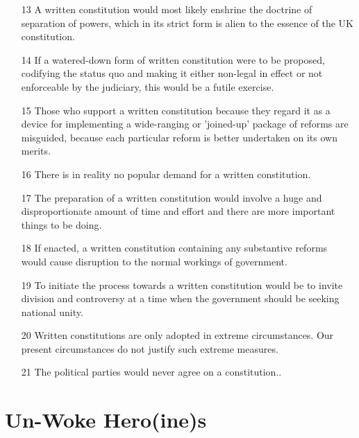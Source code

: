 \documentclass[14pt,titlepage]{extarticle}
\begin{document}
\begin{itemize}
\item[13]
 A written constitution would most likely enshrine the doctrine of
separation of powers, which in its strict form is alien to the essence of the UK
constitution.
  
\item[14]
 If a watered-down form of written constitution were to be proposed,
codifying the status quo and making it either non-legal in effect or not enforceable
by the judiciary, this would be a futile exercise.
  
\item[15]
  Those who support a written constitution because they regard it as a device
  for implementing a wide-ranging or 'joined-up' package of reforms are misguided,
  because each particular reform is better undertaken on its own merits.
  
\item[16]
 There is in reality no popular demand for a written constitution.
  
\item[17]
 The preparation of a written constitution would involve a huge and
disproportionate amount of time and effort and there are more important things to be doing.

\item[18]
  If enacted, a written constitution containing any substantive reforms would cause disruption to the normal workings of government.
  
\item[19]
 To initiate the process towards a written constitution would be to invite
division and controversy at a time when the government should be seeking
national unity.
  
\item[20]
  Written constitutions are only adopted in extreme circumstances.
  Our present circumstances do not justify such extreme measures.
  
\item[21]
  The political parties would never agree on a constitution..

\end{itemize}

\pagebreak
\section{Un-Woke Hero(ine)s}\label{heroines}
\end{document}
